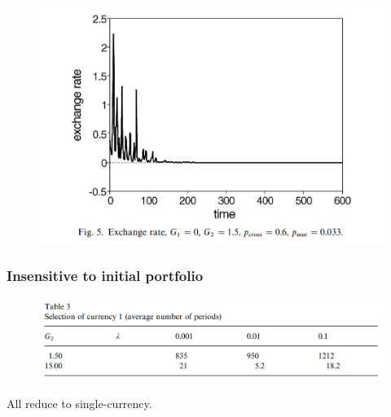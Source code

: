\begin{frame}

    \begin{figure}
        \includegraphics[width = \textwidth]{fig/large_e.png}
    \end{figure}
    
\end{frame}

\begin{frame}
    \frametitle{Insensitive to initial portfolio}

    \begin{figure}
        \includegraphics[width = \textwidth]{fig/init_p.png}
    \end{figure}

    All reduce to single-currency.
    

\end{frame}